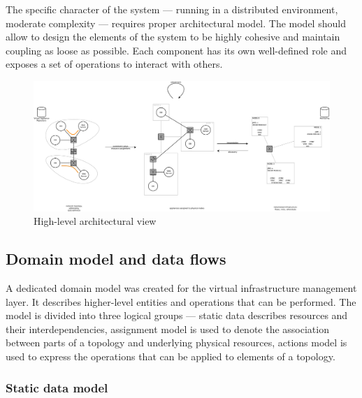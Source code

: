 \documentclass[11pt]{book}
\begin{document}

        The specific character of the system --- running in a distributed environment, moderate complexity --- requires
        proper architectural model. The model should allow to design the elements of the system to be highly cohesive
        and maintain coupling as loose as possible. Each component has its own well-defined role and exposes a set of
        operations to interact with others.


        \begin{figure}[H]
          \begin{center}
            \includegraphics[width=\textwidth]{img/architecture/scope.pdf}
          \end{center}

          \caption{High-level architectural view}
          \label{fig:arch:hl}
        \end{figure}


      \subsection{Domain model and data flows}
      \label{sec:domain-model}

        A dedicated domain model was created for the virtual infrastructure management layer. It describes higher-level
        entities and operations that can be performed. The model is divided into three logical groups --- static data
        describes resources and their interdependencies, assignment model is used to denote the association between
        parts of a topology and underlying physical resources, actions model is used to express the operations that can
        be applied to elements of a topology.


        \subsubsection{Static data model}
\end{document}
